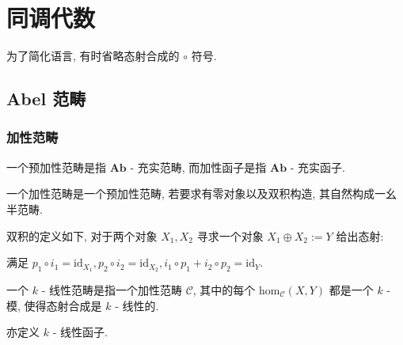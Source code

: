\section{同调代数}

为了简化语言, 有时省略态射合成的 \(\circ\) 符号.

\subsection{Abel 范畴}

\subsubsection{加性范畴}

\begin{definition}[预加性范畴]
    一个预加性范畴是指 \(\mathbf{Ab}\) - 充实范畴,
    而加性函子是指 \(\mathbf{Ab}\) - 充实函子.
\end{definition}

\begin{definition}[加性范畴]
    一个加性范畴是一个预加性范畴, 若要求有零对象以及双积构造, 其自然构成一幺半范畴.
\end{definition}

\begin{remark}
    双积的定义如下, 对于两个对象 \(X_1,X_2\) 寻求一个对象 \(X_1 \oplus X_2 := Y\) 给出态射:

    \begin{center}
    \end{center}

    满足 \(p_1 \circ i_1 = \mathrm{id}_{X_1}, p_2 \circ i_2 = \mathrm{id}_{X_2}, i_1 \circ p_1 + i_2 \circ p_2 = \mathrm{id}_Y\).
\end{remark}

\begin{definition}[\(k\) 线性]
    一个 \(k\) - 线性范畴是指一个加性范畴 \(\mathcal{C}\), 其中的每个 \(\mathrm{hom}_{\mathcal{C}} (X,Y)\) 都是一个 \(k\) - 模,
    使得态射合成是 \(k\) - 线性的.

    亦定义 \(k\) - 线性函子.
\end{definition}

